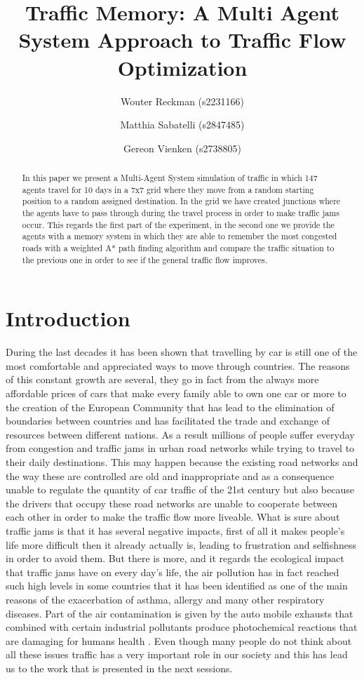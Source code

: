 \documentclass[a4paper,hidelinks]{article}
\title{\textbf{\huge Traffic Memory: A Multi Agent System Approach to Traffic Flow Optimization}%
}
\author{
	Wouter Reckman (s2231166) \and
    Matthia Sabatelli (s2847485) \and
    Gereon Vienken (s2738805) 
}
\date{}
\begin{document}
\ttl
\thispagestyle{empty}

%


\begin{abstract}
\noindent
In this paper we present a Multi-Agent System simulation of traffic in which 147 agents travel for 10 days in a 7x7 grid where they move from a random starting position to a random assigned destination. In the grid we have created junctions where the agents have to pass through during the travel process in order to make traffic jams occur. This regards the first part of the experiment, in the second one we provide the agents with a memory system in which they are able to remember the most congested roads with a weighted A* path finding algorithm and compare the traffic situation to the previous one in order to see if the general traffic flow improves. 
\end{abstract}


\section{Introduction}
During the last decades it has been shown that travelling by car is still one of the most comfortable and appreciated ways to move through countries. The reasons of this constant growth are several, they go in fact from the always more affordable prices of cars that make every family able to own one car or more to the creation of the European Community that has lead to the elimination of boundaries between countries and has facilitated the trade and exchange of resources between different nations. As a result millions of people suffer everyday from congestion and traffic jams in urban road networks while trying to travel to their daily destinations. This may happen because the existing road networks and the way these are controlled are old and inappropriate and as a consequence unable to regulate the quantity of car traffic of the 21st century but also because the drivers that occupy these road networks are unable to cooperate between each other in order to make the traffic flow more liveable. What is sure about traffic jams is that it has several negative impacts, first of all it makes people's life more difficult then it already actually is, leading to frustration and selfishness in order to avoid them. But there is more, and it regards the ecological impact that traffic jams have on every day's life, the air pollution has in fact reached such high levels in some countries that it has been identified as one of the main reasons of the exacerbation of asthma, allergy and many other respiratory diseases. Part of the air contamination is given by the auto mobile exhausts that combined with certain industrial pollutants produce photochemical reactions that are damaging for humans health \cite{ghose2005assessment}. Even though many people do not think about all these issues traffic has a very important role in our society and this has lead us to the work that is presented in the next sessions.             
\end{document}
